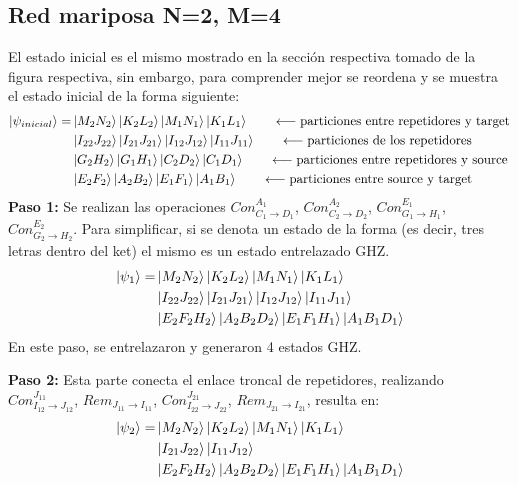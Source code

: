 \subsection{Red mariposa N=2, M=4}
El estado inicial es el mismo mostrado en la sección respectiva tomado de la figura respectiva, sin embargo, para comprender mejor se reordena y se muestra el estado inicial de la forma siguiente:
\begin{align*}
\ket{\psi_{inicial}} = &\ket{M_2 N_2}\ket{K_2 L_2}\ket{M_1 N_1} \ket{K_1 L_1}
\qquad  \longleftarrow \text{particiones entre repetidores y target}\\
& \ket{I_{22} J_{22}}  \ket{I_{21} J_{21}}  \ket{I_{12} J_{12}}  \ket{I_{11} J_{11}} 
\qquad  \longleftarrow \text{particiones de los repetidores}\\
&  \ket{G_2 H_2} \ket{G_1 H_1} \ket{C_2 D_2} \ket{C_1 D_1} 
\qquad  \longleftarrow \text{particiones entre repetidores y source}\\
& \ket{E_2 F_2} \ket{A_2 B_2}\ket{E_1 F_1}\ket{A_1 B_1}
\qquad  \longleftarrow \text{particiones entre source y target}
\end{align*}
\textbf{Paso 1:} Se realizan las operaciones $Con^{A_{1}}_{C_1 \rightarrow D_1}$, 
$Con^{A_{2}}_{C_2 \rightarrow D_2}$, 
$Con^{E_{1}}_{G_1 \rightarrow H_1}$, 
$Con^{E_{2}}_{G_2 \rightarrow H_2}$. Para simplificar, si se denota un estado de la forma  (es decir, tres letras dentro del ket) el mismo es un estado entrelazado GHZ. 
\begin{align*}
\ket{\psi_{1}} = &\ket{M_2 N_2}\ket{K_2 L_2}\ket{M_1 N_1} \ket{K_1 L_1} \\
&  \ket{I_{22} J_{22}}  \ket{I_{21} J_{21}}  \ket{I_{12} J_{12}}  \ket{I_{11} J_{11}} \\
&  \ket{E_2 F_2 H_2} \ket{A_2 B_2 D_2} \ket{E_1 F_1 H_1} \ket{A_1 B_1 D_1}
\end{align*}
En este paso, se entrelazaron y generaron 4 estados GHZ. \par \noindent
\textbf{Paso 2:} Esta parte conecta el enlace troncal de repetidores, realizando $Con^{J_{11}}_{I_{12} \rightarrow J_{12}}$,
$Rem_{J_{11} \rightarrow I_{11}}$,
$Con^{J_{21}}_{I_{22} \rightarrow J_{22}}$,
$Rem_{J_{21} \rightarrow I_{21}}$,
resulta en:
\begin{align*}
\ket{\psi_{2}} = &\ket{M_2 N_2}\ket{K_2 L_2}\ket{M_1 N_1} \ket{K_1 L_1} \\
& \ket{I_{21} J_{22}}  \ket{I_{11} J_{12}}  \\
&  \ket{E_2 F_2 H_2} \ket{A_2 B_2 D_2} \ket{E_1 F_1 H_1} \ket{A_1 B_1 D_1}
\end{align*}
